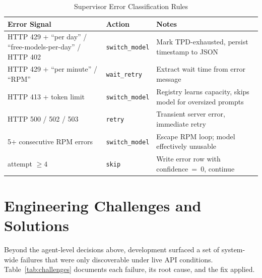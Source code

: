 \begin{table}[H]
\centering
\caption{Supervisor Error Classification Rules}
\label{tab:supervisor}
\begin{tabular}{|p{4.5cm}|p{3.0cm}|p{5.5cm}|}
\hline
\textbf{Error Signal} & \textbf{Action} & \textbf{Notes} \\
\hline
HTTP 429 + ``per day'' / ``free-models-per-day'' / HTTP 402 & \texttt{switch\_model} & Mark TPD-exhausted, persist timestamp to JSON \\
\hline
HTTP 429 + ``per minute'' / ``RPM'' & \texttt{wait\_retry} & Extract wait time from error message \\
\hline
HTTP 413 + token limit & \texttt{switch\_model} & Registry learns capacity, skips model for oversized prompts \\
\hline
HTTP 500 / 502 / 503 & \texttt{retry} & Transient server error, immediate retry \\
\hline
5+ consecutive RPM errors & \texttt{switch\_model} & Escape RPM loop; model effectively unusable \\
\hline
attempt $\geq 4$ & \texttt{skip} & Write error row with confidence~=~0, continue \\
\hline
\end{tabular}
\end{table}

\section{Engineering Challenges and Solutions}
\label{sec:challenges}

Beyond the agent-level decisions above, development surfaced a set of
system-wide failures that were only discoverable under live API conditions.
Table~\ref{tab:challenges} documents each failure, its root cause, and the fix applied.

